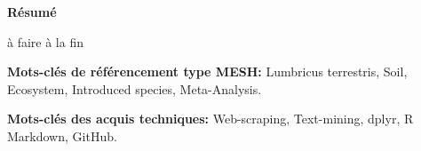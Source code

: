 \documentclass{book}
\begin{document}

\newpage
\thispagestyle{empty}
\mbox{} %


\newpage
\thispagestyle{empty}
\begin{center}
    \huge{\textbf{Résumé}}
\end{center}

\vspace{1cm}
à faire à la fin
\vspace{\baselineskip} %
\par
\textbf{Mots-clés de référencement type MESH:} Lumbricus terrestris, Soil, Ecosystem, Introduced species, Meta-Analysis.
\vspace{\baselineskip} %
\par
\textbf{Mots-clés des acquis techniques:} Web-scraping, Text-mining, dplyr, R Markdown, GitHub.
\end{document}
